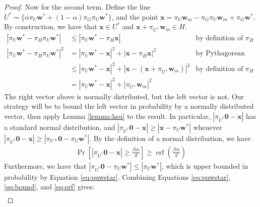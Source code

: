 \documentclass{article}
\theoremstyle{definition}
\DeclareMathOperator*{\erf}{erf}
\DeclareMathOperator*{\probop}{Pr}
\newcommand{\prob}[1]{\ensuremath{\probop\left[{#1}\right]}}
\newcommand{\proj}[1]{\ensuremath{\pi}_{#1}}
\newcommand{\comp}[1]{\ensuremath{{#1}^\bot}}
\newcommand{\zero}{\mathbf{0}}
\newcommand{\w}{\mathbf{w}}
\newcommand{\x}{\mathbf{x}}
\begin{document}
\begin{proof}
Now for the second term.
Define the line $U^* = \{\alpha\proj{U}\w^* + (1-\alpha)\proj{G}\proj{U}\w^*\}$,
and the point $\x = \proj{U}\w_m - \proj{G}\proj{U}\w_m+ \proj{G}\w^*$.
By construction, we have that $\x\in U^*$ and $\x+\proj{\comp U}\w_m\in H$.
\begin{align}
|\proj{U}\w^* - \proj{H}\proj{U}\w^*|
&\le
|\proj{U}\w^* - \proj{H}\x|
&\text{by definition of $\proj{H}$}
\\
|\proj{U}\w^* - \proj{H}\proj{U}\w^*|^2
&=
|\proj{U}\w^*-\x|^2 + |\x-\proj{H}\x|^2
&\text{by Pythagorean theorem}
\\
&\le
|\proj{U}\w^*-\x|^2 + |\x-(\x+\proj{\comp U}\w_m)|^2
&\text{by definition of $\proj{H}$}
\\
&=
|\proj{U}\w^*-\x|^2 + |\proj{\comp U}\w_m|^2
\label{eq:bound}
\end{align}
The right vector above is normally distributed,
but the left vector is not.
Our strategy will be to bound the left vector in probability by a normally distributed vector,
then apply Lemma \ref{lemma:hsu} to the result.
In particular,
$|\proj{U^*}\zero -\x|$ has a standard normal distribution,
and $|\proj{U^*}\zero -\x| \ge |\x - \proj{U}\w^*|$
whenever $|\proj{U^*}\zero -\x| \ge |\proj{U*}\zero - \proj{U}\w^*|$.
By the definition of a normal distribution, we have
\begin{align}
\label{eq:erf}
\prob{|\proj{U^*}\zero - \x| \ge \frac{\beta m}{d}}
\ge
\erf\left(\frac{\beta m}{d}\right)
\end{align}
Furthermore, we have that $|\proj{U^*}\zero - \proj{U}\w^*| \le |\proj{U}\w^*|$,
which is upper bounded in probability by Equation \ref{eq:puwstar}.
Combining Equations \ref{eq:puwstar}, \ref{eq:bound}, and \ref{eq:erf} gives:
\begin{multline}

\end{multline}
\end{proof}
\end{document}
